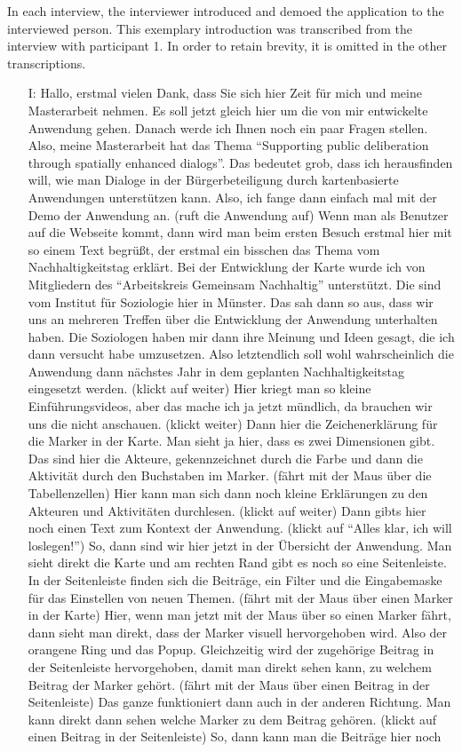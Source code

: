 \label{demo}
In each interview, the interviewer introduced and demoed the application to the interviewed person. This exemplary introduction was transcribed from the interview with participant 1. In order to retain brevity, it is omitted in the other transcriptions.

\begin{itemize}
\item[I:] Hallo, erstmal vielen Dank, dass Sie sich hier Zeit f{\"u}r mich und meine Masterarbeit nehmen. Es soll jetzt gleich hier um die von mir entwickelte Anwendung gehen. Danach werde ich Ihnen noch ein paar Fragen stellen. Also, meine Masterarbeit hat das Thema "`Supporting public deliberation through spatially enhanced dialogs"'. Das bedeutet grob, dass ich herausfinden will, wie man Dialoge in der B{\"u}rgerbeteiligung durch kartenbasierte Anwendungen unterst{\"u}tzen kann. Also, ich fange dann einfach mal mit der Demo der Anwendung an. (ruft die Anwendung auf) Wenn man als Benutzer auf die Webseite kommt, dann wird man beim ersten Besuch erstmal hier mit so einem Text begr{\"u}{\ss}t, der erstmal ein bisschen das Thema vom Nachhaltigkeitstag erkl{\"a}rt. Bei der Entwicklung der Karte wurde ich von Mitgliedern des "`Arbeitskreis Gemeinsam Nachhaltig"' unterst{\"u}tzt. Die sind vom Institut f{\"u}r Soziologie hier in M{\"u}nster. Das sah dann so aus, dass wir uns an mehreren Treffen {\"u}ber die Entwicklung der Anwendung unterhalten haben. Die Soziologen haben mir dann ihre Meinung und Ideen gesagt, die ich dann versucht habe umzusetzen. Also letztendlich soll wohl wahrscheinlich die Anwendung dann n{\"a}chstes Jahr in dem geplanten Nachhaltigkeitstag eingesetzt werden. (klickt auf weiter) Hier kriegt man so kleine Einf{\"u}hrungsvideos, aber das mache ich ja jetzt m{\"u}ndlich, da brauchen wir uns die nicht anschauen. (klickt weiter) Dann hier die Zeichenerkl{\"a}rung f{\"u}r die Marker in der Karte. Man sieht ja hier, dass es zwei Dimensionen gibt. Das sind hier die Akteure, gekennzeichnet durch die Farbe und dann die Aktivit{\"a}t durch den Buchstaben im Marker. (f{\"a}hrt mit der Maus {\"u}ber die Tabellenzellen) Hier kann man sich dann noch kleine Erkl{\"a}rungen zu den Akteuren und Aktivit{\"a}ten durchlesen. (klickt auf weiter) Dann gibts hier noch einen Text zum Kontext der Anwendung. (klickt auf "`Alles klar, ich will loslegen!"') So, dann sind wir hier jetzt in der {\"U}bersicht der Anwendung. Man sieht direkt die Karte und am rechten Rand gibt es noch so eine Seitenleiste. In der Seitenleiste finden sich die Beitr{\"a}ge, ein Filter und die Eingabemaske f{\"u}r das Einstellen von neuen Themen. (f{\"a}hrt mit der Maus {\"u}ber einen Marker in der Karte) Hier, wenn man jetzt mit der Maus {\"u}ber so einen Marker f{\"a}hrt, dann sieht man direkt, dass der Marker visuell hervorgehoben wird. Also der orangene Ring und das Popup. Gleichzeitig wird der zugeh{\"o}rige Beitrag in der Seitenleiste hervorgehoben, damit man direkt sehen kann, zu welchem Beitrag der Marker geh{\"o}rt. (f{\"a}hrt mit der Maus {\"u}ber einen Beitrag in der Seitenleiste) Das ganze funktioniert dann auch in der anderen Richtung. Man kann direkt dann sehen welche Marker zu dem Beitrag geh{\"o}ren. (klickt auf einen Beitrag in der Seitenleiste) So, dann kann man die Beitr{\"a}ge hier noch 
\end{itemize}
